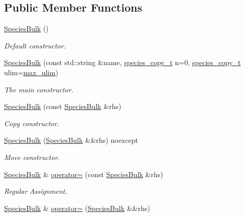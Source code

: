 \subsection*{Public Member Functions}
\begin{DoxyCompactItemize}
\item 
\hyperlink{classchem_1_1SpeciesBulk_a1923eee58108af0529df6f9e7fdbc80e}{Species\-Bulk} ()
\begin{DoxyCompactList}\small\item\em Default constructor. \end{DoxyCompactList}\item 
\hyperlink{classchem_1_1SpeciesBulk_a8b4f80f5b0d6385250c936a24cca0d81}{Species\-Bulk} (const std\-::string \&name, \hyperlink{common_8h_a3503f321fd36304ee274141275cca586}{species\-\_\-copy\-\_\-t} n=0, \hyperlink{common_8h_a3503f321fd36304ee274141275cca586}{species\-\_\-copy\-\_\-t} ulim=\hyperlink{common_8h_adaf831a0b61083f29adf8fc6e8edab35}{max\-\_\-ulim})
\begin{DoxyCompactList}\small\item\em The main constructor. \end{DoxyCompactList}\item 
\hyperlink{classchem_1_1SpeciesBulk_a275b12de8e39aef164ed04c523181bfb}{Species\-Bulk} (const \hyperlink{classchem_1_1SpeciesBulk}{Species\-Bulk} \&rhs)
\begin{DoxyCompactList}\small\item\em Copy constructor. \end{DoxyCompactList}\item 
\hyperlink{classchem_1_1SpeciesBulk_ab53bee8acf46517803bea706ac7d9685}{Species\-Bulk} (\hyperlink{classchem_1_1SpeciesBulk}{Species\-Bulk} \&\&rhs) noexcept
\begin{DoxyCompactList}\small\item\em Move constructor. \end{DoxyCompactList}\item 
\hyperlink{classchem_1_1SpeciesBulk}{Species\-Bulk} \& \hyperlink{classchem_1_1SpeciesBulk_ad0e657ab81d9b37475dbc9235b2f48c4}{operator=} (const \hyperlink{classchem_1_1SpeciesBulk}{Species\-Bulk} \&rhs)
\begin{DoxyCompactList}\small\item\em Regular Assignment. \end{DoxyCompactList}\item 
\hyperlink{classchem_1_1SpeciesBulk}{Species\-Bulk} \& \hyperlink{classchem_1_1SpeciesBulk_a9ffd987e1f885746fcb6f6d5293692f3}{operator=} (\hyperlink{classchem_1_1SpeciesBulk}{Species\-Bulk} \&\&rhs)

\end{DoxyCompactItemize}
